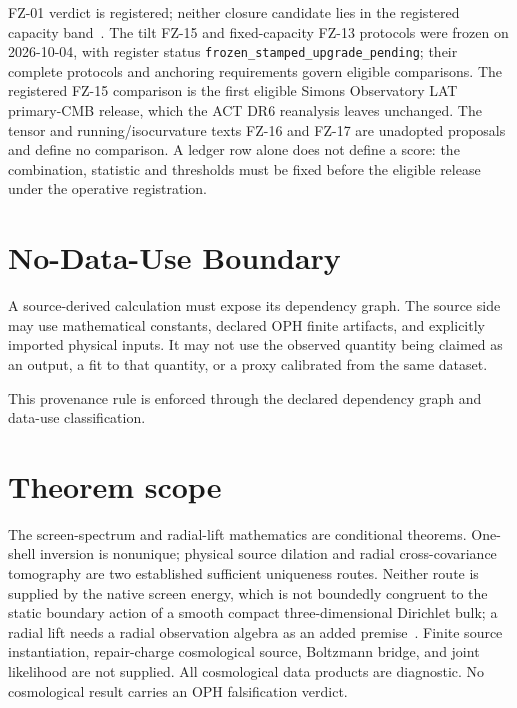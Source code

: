 \documentclass[11pt]{article}
\begin{document}
FZ-01 verdict is registered; neither closure candidate lies in the
registered capacity band~\cite{ophladder}. The tilt FZ-15 and fixed-capacity
FZ-13 protocols were frozen on 2026-10-04, with register status
\texttt{frozen\_stamped\_upgrade\_pending}; their complete protocols and
anchoring requirements govern eligible comparisons. The registered FZ-15
comparison is the first eligible Simons Observatory LAT primary-CMB
release, which the ACT DR6 reanalysis leaves unchanged. The tensor and
running/isocurvature texts FZ-16 and FZ-17 are unadopted proposals and
define no comparison. A ledger row alone
does not define a score: the combination, statistic and thresholds must be
fixed before the eligible release under the operative registration.

\section{No-Data-Use Boundary}

A source-derived calculation must expose its dependency graph. The source side
may use mathematical constants, declared OPH finite artifacts, and explicitly
imported physical inputs. It may not use the observed quantity being claimed as
an output, a fit to that quantity, or a proxy calibrated from the same dataset.

This provenance rule is enforced through the declared dependency graph and
data-use classification.

\section{Theorem scope}

The screen-spectrum and radial-lift mathematics are conditional theorems.
One-shell inversion is nonunique; physical source dilation and radial
cross-covariance tomography are two established sufficient uniqueness routes.
Neither route is supplied by the native screen energy, which is not
boundedly congruent to the static boundary action of a smooth compact
three-dimensional Dirichlet bulk; a radial lift needs a radial observation
algebra as an added premise~\cite{ophcontinuum}.
Finite source instantiation, repair-charge cosmological source, Boltzmann
bridge, and joint likelihood are not supplied. All cosmological
data products are diagnostic. No cosmological result carries an OPH
falsification verdict.
\end{document}
